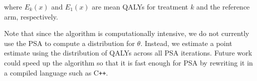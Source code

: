 \documentclass[11pt,final,fleqn]{article}\usepackage[]{graphicx}\usepackage[]{color}
\theoremstyle{plain}
\newcommand\CPP{{C\texttt{++}}}
\begin{document}
\begin{appendices}
where $E_k(x)$ and $E_1(x)$ are mean QALYs for treatment $k$ and the reference arm, respectively. 

Note that since the algorithm is computationally intensive, we do not currently use the PSA to compute a distribution for $\theta$. Instead, we estimate a point estimate using the distribution of QALYs across all PSA iterations. Future work could speed up the algorithm so that it is fast enough for PSA by rewriting it in a compiled language such as \CPP{}.  

\end{appendices}

\end{document}

